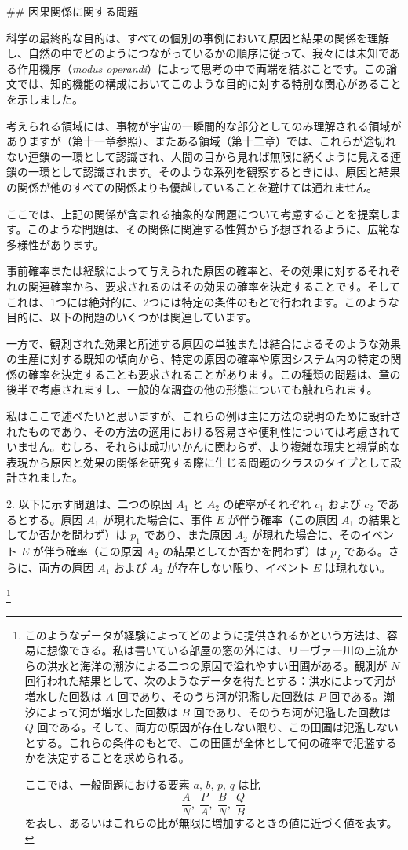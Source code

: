 \documentclass[a4paper,11pt,openany]{ltjsbook}
\begin{document}
\#\# 因果関係に関する問題

科学の最終的な目的は、すべての個別の事例において原因と結果の関係を理解し、自然の中でどのようにつながっているかの順序に従って、我々には未知である作用機序（\textit{modus operandi}）によって思考の中で両端を結ぶことです。この論文では、知的機能の構成においてこのような目的に対する特別な関心があることを示しました。

考えられる領域には、事物が宇宙の一瞬間的な部分としてのみ理解される領域がありますが（第十一章参照）、またある領域（第十二章）では、これらが途切れない連鎖の一環として認識され、人間の目から見れば無限に続くように見える連鎖の一環として認識されます。そのような系列を観察するときには、原因と結果の関係が他のすべての関係よりも優越していることを避けては通れません。

ここでは、上記の関係が含まれる抽象的な問題について考慮することを提案します。このような問題は、その関係に関連する性質から予想されるように、広範な多様性があります。

事前確率または経験によって与えられた原因の確率と、その効果に対するそれぞれの関連確率から、要求されるのはその効果の確率を決定することです。そしてこれは、1つには絶対的に、2つには特定の条件のもとで行われます。このような目的に、以下の問題のいくつかは関連しています。

一方で、観測された効果と所述する原因の単独または結合によるそのような効果の生産に対する既知の傾向から、特定の原因の確率や原因システム内の特定の関係の確率を決定することも要求されることがあります。この種類の問題は、章の後半で考慮されますし、一般的な調査の他の形態についても触れられます。

私はここで述べたいと思いますが、これらの例は主に方法の説明のために設計されたものであり、その方法の適用における容易さや便利性については考慮されていません。むしろ、それらは成功いかんに関わらず、より複雑な現実と視覚的な表現から原因と効果の関係を研究する際に生じる問題のクラスのタイプとして設計されました。

2. 以下に示す問題は、二つの原因 \(A_1\) と \(A_2\) の確率がそれぞれ \(c_1\) および \(c_2\) であるとする。原因 \(A_1\) が現れた場合に、事件 \(E\) が伴う確率（この原因 \(A_1\) の結果としてか否かを問わず）は \(p_1\) であり、また原因 \(A_2\) が現れた場合に、そのイベント \(E\) が伴う確率（この原因 \(A_2\) の結果としてか否かを問わず）は \(p_2\) である。さらに、両方の原因 \(A_1\) および \(A_2\) が存在しない限り、イベント \(E\) は現れない。

\footnote{このようなデータが経験によってどのように提供されるかという方法は、容易に想像できる。私は書いている部屋の窓の外には、リーヴァー川の上流からの洪水と海洋の潮汐による二つの原因で溢れやすい田圃がある。観測が \(N\) 回行われた結果として、次のようなデータを得たとする：洪水によって河が増水した回数は \(A\) 回であり、そのうち河が氾濫した回数は \(P\) 回である。潮汐によって河が増水した回数は \(B\) 回であり、そのうち河が氾濫した回数は \(Q\) 回である。そして、両方の原因が存在しない限り、この田圃は氾濫しないとする。これらの条件のもとで、この田圃が全体として何の確率で氾濫するかを決定することを求められる。

ここでは、一般問題における要素 \(a\), \(b\), \(p\), \(q\) は比
\[
  \frac{A}{N},\; \frac{P}{A},\; \frac{B}{N},\; \frac{Q}{B}
\]
を表し、あるいはこれらの比が無限に増加するときの値に近づく値を表す。}
\end{document}
